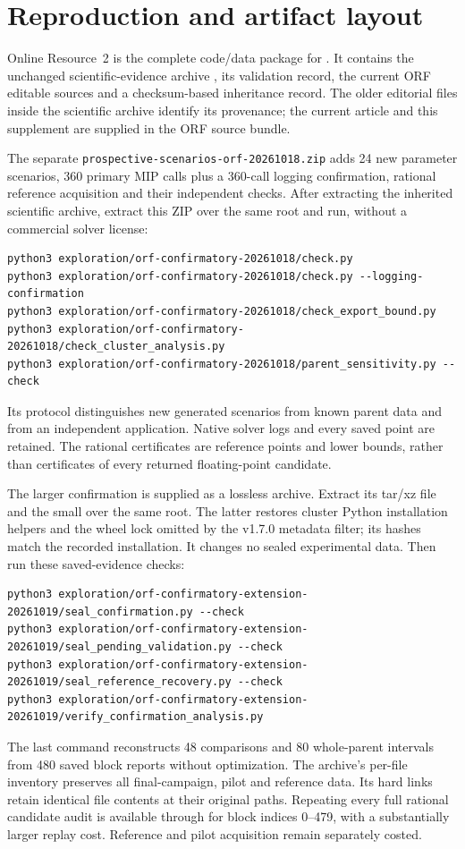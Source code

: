 \section{Reproduction and artifact layout}
Online Resource~2 is the complete code/data package for
. It contains the unchanged scientific-evidence archive
, its validation record, the current ORF editable
sources and a checksum-based inheritance record. The older editorial files inside
the scientific archive identify its provenance; the current article and this
supplement are supplied in the ORF source bundle.

The separate \texttt{prospective-scenarios-orf-20261018.zip} adds 24 new parameter
scenarios, 360 primary MIP calls plus a 360-call logging confirmation, rational reference acquisition and their independent
checks. After extracting the inherited scientific archive, extract this ZIP
over the same root and run, without a commercial solver license:
\begin{lstlisting}
python3 exploration/orf-confirmatory-20261018/check.py
python3 exploration/orf-confirmatory-20261018/check.py --logging-confirmation
python3 exploration/orf-confirmatory-20261018/check_export_bound.py
python3 exploration/orf-confirmatory-20261018/check_cluster_analysis.py
python3 exploration/orf-confirmatory-20261018/parent_sensitivity.py --check
\end{lstlisting}
Its protocol distinguishes new generated scenarios from known parent data and
from an independent application. Native solver logs and every saved point are
retained. The rational certificates are reference points and lower bounds,
rather than certificates of every returned floating-point candidate.

The larger confirmation is supplied as a lossless archive. Extract its tar/xz
file and the small  over the same root.
The latter restores cluster Python installation helpers and the wheel lock
omitted by the v1.7.0 metadata filter; its hashes match the recorded installation.
It changes no sealed experimental data. Then run these saved-evidence checks:
\begin{lstlisting}
python3 exploration/orf-confirmatory-extension-20261019/seal_confirmation.py --check
python3 exploration/orf-confirmatory-extension-20261019/seal_pending_validation.py --check
python3 exploration/orf-confirmatory-extension-20261019/seal_reference_recovery.py --check
python3 exploration/orf-confirmatory-extension-20261019/verify_confirmation_analysis.py
\end{lstlisting}
The last command reconstructs 48 comparisons and 80 whole-parent intervals
from 480 saved block reports without optimization. The archive's per-file
inventory preserves all final-campaign, pilot and reference data. Its hard
links retain identical file contents at their original paths. Repeating every
full rational candidate audit is available through
 for block indices 0--479, with a substantially
larger replay cost. Reference and pilot acquisition remain separately costed.

